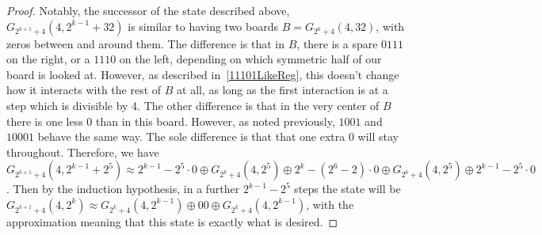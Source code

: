 \documentclass[12pt,letterpaper]{article}
\begin{document}
\begin{proof}
  Notably, the successor of the state described above, $G_{2^{k+1}+4}(4,2^{k-1}+32)$ is similar to having two boards $B=G_{2^6+4}(4, 32)$, with zeros between and around them. The difference is that in $B$, there is a spare $0111$ on the right, or a $1110$ on the left, depending on which symmetric half of our board is looked at. However, as described in~\cref{11101LikeReg}, this doesn't change how it interacts with the rest of $B$ at all, as long as the first interaction is at a step which is divisible by 4. The other difference is that in the very center of $B$ there is one less 0 than in this board. However, as noted previously, $1001$ and $10001$ behave the same way. The sole difference is that that one extra $0$ will stay throughout. Therefore, we have $G_{2^{k+1}+4}(4,2^{k-1}+2^5)\approx 2^{k-1}-2^5\cdot 0\oplus G_{2^k+4}(4,2^5)\oplus 2^k-(2^6-2)\cdot 0\oplus G_{2^6+4}(4,2^5)\oplus 2^{k-1}-2^5\cdot 0$. Then by the induction hypothesis, in a further $2^{k-1}-2^5$ steps the state will be $G_{2^{k+1}+4}(4,2^k)\approx G_{2^k+4}(4,2^{k-1})\oplus 00\oplus G_{2^k+4}(4,2^{k-1})$, with the approximation meaning that this state is exactly what is desired. 
\end{proof}
\end{document}
